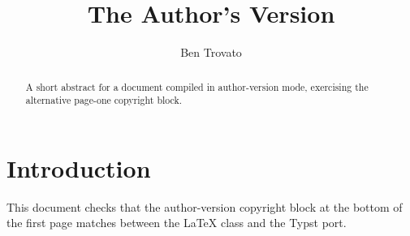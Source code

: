 \documentclass[acmsmall,authorversion]{acmart}
\begin{document}
\title{The Author's Version}

\author{Ben Trovato}

\renewcommand{\shortauthors}{Trovato}

\begin{abstract}
  A short abstract for a document compiled in author-version mode, exercising the
  alternative page-one copyright block.
\end{abstract}

\maketitle

\section{Introduction}
This document checks that the author-version copyright block at the bottom of the
first page matches between the LaTeX class and the Typst port.
\end{document}
